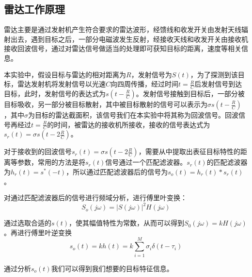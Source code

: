 \documentclass[12pt]{article}
\begin{document}
\subsection{雷达工作原理}
雷达主要是通过发射机产生符合要求的雷达波形，经馈线和收发开关由发射天线辐射出去，遇到目标之后，一部分电磁波发生反射，经接收天线和收发开关由接收机接收回波信号，通过对雷达信号做适当的处理即可获知目标的距离，速度等相关信息。\par
本实验中，假设目标与雷达的相对距离为$R$，发射信号为$S(t)$，为了探测到该目标，雷达发射机将发射信号以光速$C$向四周传播，经过时间$t=\frac{R}{C}$后发射信号到达目标，此时，发射信号的表达式为$s(t-\frac{R}{C})$。发射信号接触到目标后，一部分被目标吸收，另一部分被目标散射，其中被目标散射的信号可以表示为$\sigma s(t-\frac{R}{C})$，其中$\sigma$为目标的雷达截面积，该信号我们在本实验中将其称为回波信号。回波信号再经过$t=\frac{R}{C}$的时间，被雷达的接收机所接收，接收的信号表达式为$s_r (t)=\sigma s(t-2 \frac{R}{C})$。\par
对于接收到的回波信号$s_r (t)=σs(t-2\frac{R}{C})$，需要从中提取出表征目标特性的距离等参数，常用的方法是将$s_r (t)$信号通过一个匹配滤波器。$s_r (t)$的匹配滤波器为$h_r (t)=s^* (-t)$，所以通过匹配滤波器后的信号为$s_o (t)=h_r (t)*s_r (t)$。\par
对通过匹配滤波器后的信号进行频域分析，进行傅里叶变换：
\begin{equation}\label{fuliyebianhuan}
 S_o (j\omega)=|S(j\omega)|^2 H(j\omega)
\end{equation}\par
通过选取合适的$s(t)$，使其幅值特性为常数，从而可以得到$S_0 (j\omega)=kH(j\omega)$。再进行傅里叶逆变换
\begin{equation}\label{fuliyenihuanhuan}
 s_o (t)=kh(t)=k\sum_{i=1}^M\sigma_i\delta(t-\tau_i)
\end{equation}\par
通过分析$s_o (t)$我们可以得到我们想要的目标特征信息。
\end{document}
